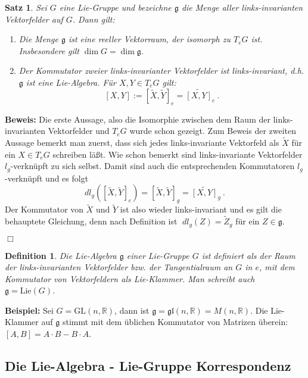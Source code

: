 \documentclass[12pt,a4paper]{article}
\def\R{\mathbb{R}}
\def\GL{\mathrm{GL}}
\def\g{\mathfrak{g}}
\def\gl{\mathfrak{gl}}
\newtheorem{Satz}[Lemma]{Satz}
\newtheorem{Definition}[Lemma]{Definition}
\def\proof{\noindent\textbf{Beweis:}\quad}
\def\qed{\quad\hfill\ensuremath{\Box}}
\begin{document}
\begin{Satz}\label{LA}
Sei $G$ eine Lie-Gruppe und bezeichne $\g$ die Menge aller links-invarianten Vektorfelder auf $G$.
Dann gilt:
\begin{enumerate}
\item
Die Menge $\g$ ist eine reeller Vektorraum, der isomorph zu $T_eG$ ist. Insbesondere gilt
$\dim G = \dim \g$.

\item
Der Kommutator zweier links-invarianter Vektorfelder ist links-invariant, d.h. $\g$ ist eine
Lie-Algebra. F\"ur $X, Y \in T_eG$ gilt:
$$
[X, Y] := [\tilde X, \tilde Y]_e = \widetilde{[X,Y]}_e \ .
$$
\end{enumerate}
\end{Satz}
\proof
Die erste Aussage, also die Isomorphie zwischen dem Raum der links-invarianten Vektorfelder und
$T_eG$ wurde schon gezeigt. Zum Beweis der zweiten Aussage bemerkt man zuerst, dass sich jedes
links-invariante Vektorfeld als $\tilde X$ f\"ur ein $X\in T_e G$ schreiben l\"a\ss t. Wie schon
bemerkt sind links-invariante Vektorfelder $l_g$-verkn\"upft zu sich selbst. Damit sind auch die
entsprechenden Kommutatoren $l_g$-verkn\"upft und es folgt
$$
dl_g ([\tilde X, \tilde Y]_e) = [\tilde X, \tilde Y ]_g = \widetilde{[ X,  Y]}_g \ .
$$
Der Kommutator von $\tilde X$ und $\tilde Y$ ist also wieder links-invariant und es gilt die behauptete
Gleichung, denn nach Definition ist $\; dl_g (Z) = \tilde Z_g$ f\"ur ein $Z\in \g$.

\qed

\begin{Definition}
Die {\em Lie-Algebra} $\g$ einer Lie-Gruppe $G$ ist definiert als der Raum der links-invarianten
Vektorfelder bzw. der Tangentialraum an $G$ in $e$, mit dem Kommutator von Vektorfeldern als
Lie-Klammer. Man schreibt auch $\g = \mathrm{Lie}(G)$.
\end{Definition}

{\bf Beispiel:}
Sei $G= \GL(n,\R)$, dann ist $\g = \gl (n,\R)= M(n,\R)$. Die Lie-Klammer
auf $\g$ stimmt mit dem \"ublichen Kommutator von Matrizen \"uberein:
$[A, B] = A\cdot B - B\cdot A$.

\bigskip

\subsection{Die Lie-Algebra - Lie-Gruppe Korrespondenz}
\end{document}
